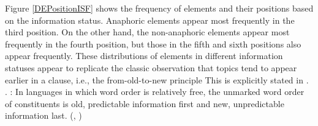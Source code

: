 Figure \ref{DEPositionISF} shows the frequency of elements and their positions
based on the information status.
Anaphoric elements appear most frequently in the third position.
On the other hand, the non-anaphoric elements appear most frequently in the fourth position,
but those in the fifth and sixth positions also appear frequently.
These distributions of elements in different information statuses appear to replicate the classic observation that
topics tend to appear earlier in a clause,
i.e., the from-old-to-new principle \cite{mathesius28,firbas64,danes70,kuno78,gundel88}
This is explicitly stated in \Next.
%
\ex. \label{oldnewprinciple}:
 In languages in which word order is relatively free,
 the unmarked word order of constituents is old,
 predictable information first and new, unpredictable information last.
 \hfill{(, )}


